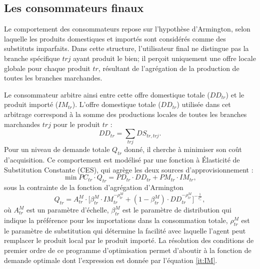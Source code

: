 \documentclass[11pt,a4paper]{article}
\newcommand{\trj}{\mathit{trj}}
\newcommand{\DD}{\mathit{DD}}
\newcommand{\DS}{\mathit{DS}}
\newcommand{\IM}{\mathit{IM}}
\newcommand{\PC}{\mathit{PC}}
\newcommand{\PD}{\mathit{PD}}
\newcommand{\PM}{\mathit{PM}}
\newcommand{\tr}{\mathit{tr}}
\begin{document}
	
	\subsection{Les consommateurs finaux}
	Le comportement des consommateurs repose sur l'hypothèse d'Armington, selon laquelle les produits domestiques et importés sont considérés comme des substituts imparfaits. Dans cette structure, l'utilisateur final ne distingue pas la branche spécifique $\trj$ ayant produit le bien; il perçoit uniquement une offre locale globale pour chaque produit $\tr$, résultant de l'agrégation de la production de toutes les branches marchandes. 
	
	Le consommateur arbitre ainsi entre cette offre domestique totale ($\DD_{\tr}$) et le produit importé ($\IM_{\tr}$). L'offre domestique totale ($\DD_{tr}$) utilisée dans cet arbitrage correspond à la somme des productions locales de toutes les branches marchandes $\trj$ pour le produit $\tr$ :
	\begin{equation*}
		\DD_{\tr} = \sum_{\trj} \DS_{\tr, \trj}.
	\end{equation*}
	Pour un niveau de demande totale $Q_{\tr}$ donné, il cherche à minimiser son coût d'acquisition. Ce comportement est modélisé par une fonction à {Élasticité de Substitution Constante (CES)}, qui agrège les deux sources d'approvisionnement :
	\begin{equation*}
		\min \PC_{\tr} \cdot Q_{\tr} = \PD_{tr} \cdot \DD_{\tr} + \PM_{\tr} \cdot \IM_{\tr},
	\end{equation*}
	sous la contrainte de la fonction d'agrégation d'Armington
	\begin{equation*}
		Q_{\tr} = A_{\tr}^M \cdot \bigg[\beta_{\tr}^M\cdot\IM_{\tr}^{-\rho_{\tr}^M} + \left(1 - \beta_{\tr}^M\right)\cdot\DD_{\tr}^{-\rho_{\tr}^M}\bigg]^{-\frac{1}{^{\rho_{\tr}^M}}},
	\end{equation*}
	où $A_{\tr}^M$ est un paramètre d'échelle, $\beta_{\tr}^M$ est le paramètre de distribution qui indique la préférence pour les importations dans la consommation totale, $\rho_{\tr}^M$ est le paramètre de substitution qui détermine la facilité avec laquelle l'agent peut remplacer le produit local par le produit importé. La résolution des conditions de premier ordre de ce programme d'optimisation permet d'aboutir à la fonction de demande optimale dont l'expression est donnée par l'équation \ref{it:IM}.
	
	
	
	

	
	
\end{document}
